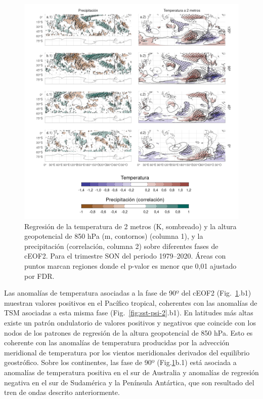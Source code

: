 \documentclass[12pt,oneside,a4paper]{reedthesis}
\begin{document}
\begin{figure}

{\centering \includegraphics{figures/20-ceofs/pp-temp-2-1} 

}

\caption{Regresión de la temperatura de 2 metros (K, sombreado) y la altura geopotencial de 850 hPa (m, contornos) (columna 1), y la precipitación (correlación, columna 2) sobre diferentes fases de cEOF2. Para el trimestre SON del periodo 1979--2020. Áreas con puntos marcan regiones donde el p-valor es menor que 0,01 ajustado por FDR.}\label{fig:pp-temp-2}
\end{figure}

Las anomalías de temperatura asociadas a la fase de 90º del cEOF2 (Fig.~\ref{fig:pp-temp-2}.b1) muestran valores positivos en el Pacífico tropical, coherentes con las anomalías de TSM asociadas a esta misma fase (Fig.~\ref{fig:sst-psi-2}.b1).
En latitudes más altas existe un patrón ondulatorio de valores positivos y negativos que coincide con los nodos de los patrones de regresión de la altura geopotencial de 850 hPa.
Esto es coherente con las anomalías de temperatura producidas por la advección meridional de temperatura por los vientos meridionales derivados del equilibrio geostrófico.
Sobre los continentes, las fase de 90º (Fig.\ref{fig:pp-temp-2}b.1) está asociada a anomalías de temperatura positiva en el sur de Australia y anomalías de regresión negativa en el sur de Sudamérica y la Península Antártica, que son resultado del tren de ondas descrito anteriormente.
\end{document}
